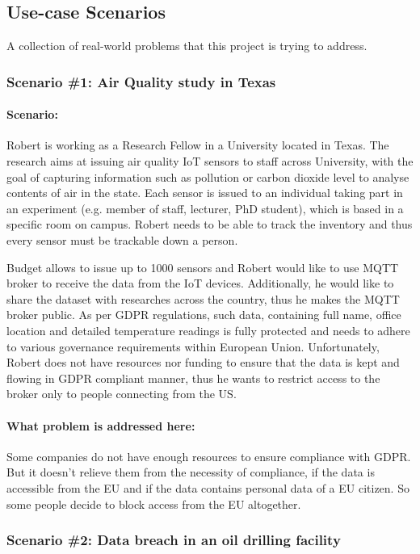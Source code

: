 \subsection{Use-case Scenarios}
A collection of real-world problems that this project is trying to address.
\subsubsection{\textbf{Scenario \#1: Air Quality study in Texas}}
\paragraph{\textbf{Scenario:}}
Robert is working as a Research Fellow in a University located in Texas. The research aims at issuing air quality IoT sensors to staff across University, with the goal of capturing information such as pollution or carbon dioxide level to analyse contents of air in the state. Each sensor is issued to an individual taking part in an experiment (e.g. member of staff, lecturer, PhD student), which is based in a specific room on campus. Robert needs to be able to track the inventory and thus every sensor must be trackable down a person.

Budget allows to issue up to 1000 sensors and Robert would like to use MQTT broker to receive the data from the IoT devices. Additionally, he would like to share the dataset with researches across the country, thus he makes the MQTT broker public. As per GDPR regulations, such data, containing full name, office location and detailed temperature readings is fully protected and needs to adhere to various governance requirements within European Union. Unfortunately, Robert does not have resources nor funding to ensure that the data is kept and flowing in GDPR compliant manner, thus he wants to restrict access to the broker only to people connecting from the US.
\paragraph{\textbf{What problem is addressed here:}}
Some companies do not have enough resources to ensure compliance with GDPR. But it doesn't relieve them from the necessity of compliance, if the data is accessible from the EU and if the data contains personal data of a EU citizen. So some people decide to block access from the EU altogether. 
\subsubsection{\textbf{Scenario \#2: Data breach in an oil drilling facility}}

